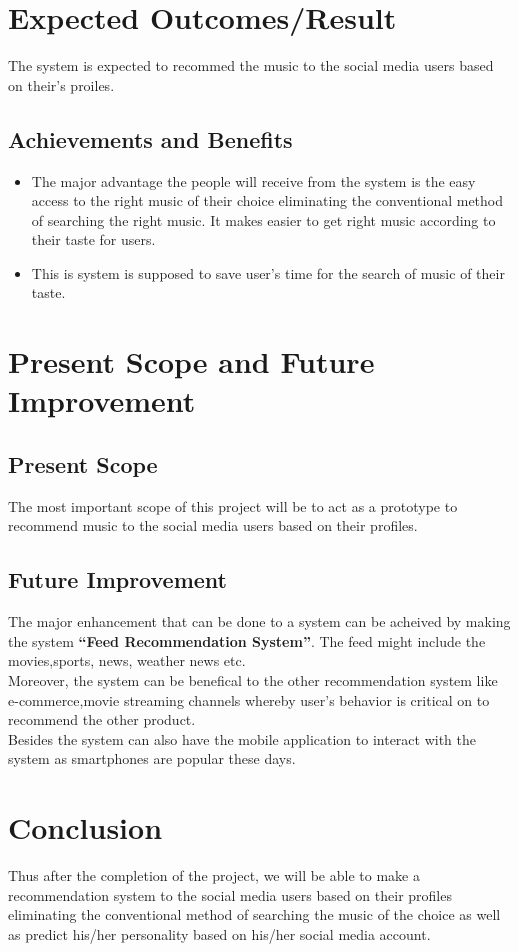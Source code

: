 \documentclass[a4paper,12pt]{article}
\begin{document}
\section{Expected Outcomes/Result}
The system is expected to recommed the music to the social media users based on their's proiles.
\subsection{Achievements and Benefits}
\begin{itemize}
\item The major advantage the people will receive from the system is the easy access to the right music of their choice eliminating the conventional method of searching the right music. It makes easier to get right music according to their taste for users.
\item This is system is supposed to save user's time for the search of music of their taste.
\end{itemize}
\cleardoublepage

\section{Present Scope and Future Improvement}
\subsection{Present Scope}
The most important scope of this project will be to act as a prototype to recommend music to the social media users based on their profiles.
\subsection{Future Improvement}
The major enhancement that can be done to a system can be acheived by making the system \textbf{``Feed Recommendation System''}. The feed might include the movies,sports, news, weather news etc.\\
Moreover, the system can be benefical to the other recommendation system like e-commerce,movie streaming channels whereby user's behavior is critical on to recommend the other product.\\
Besides the system can also have the mobile application to interact with the system as smartphones are popular these days.
\cleardoublepage

\section{Conclusion}
Thus after the completion of the project, we will be able to make a recommendation system to the social media users based on their profiles eliminating the conventional method of searching the music of the choice as well as predict his/her personality based on his/her social media account.
\cleardoublepage
\end{document}

